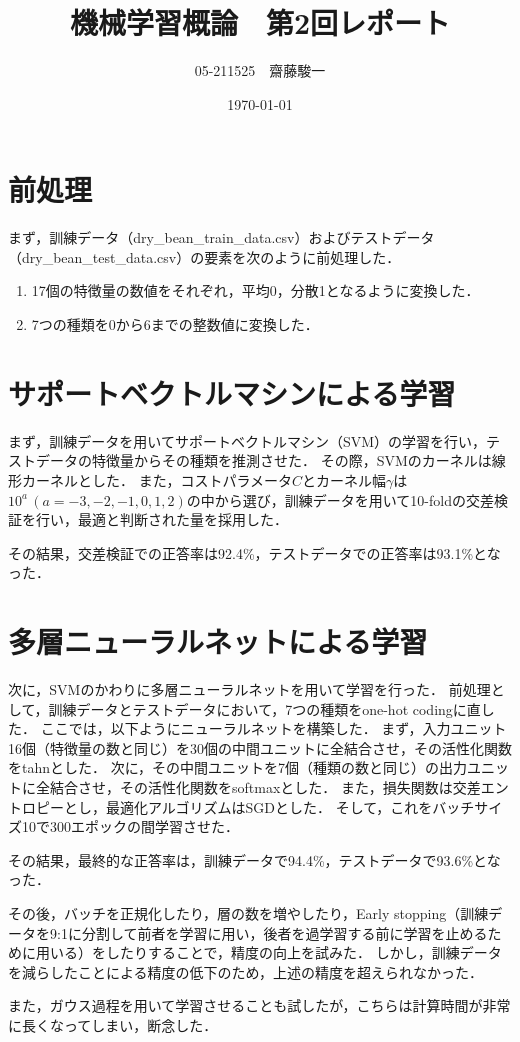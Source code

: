 \documentclass[a4paper,11pt]{jsarticle}
\begin{document}
\title{機械学習概論　第2回レポート}
\author{05-211525　齋藤駿一}
\date{\today}
\maketitle

\section{前処理}
まず，訓練データ（dry\_bean\_train\_data.csv）およびテストデータ（dry\_bean\_test\_data.csv）の要素を次のように前処理した．

\begin{enumerate}
  \item 17個の特徴量の数値をそれぞれ，平均0，分散1となるように変換した．
  \item 7つの種類を0から6までの整数値に変換した．
\end{enumerate}

\section{サポートベクトルマシンによる学習}

まず，訓練データを用いてサポートベクトルマシン（SVM）の学習を行い，テストデータの特徴量からその種類を推測させた．
その際，SVMのカーネルは線形カーネルとした．
また，コストパラメータ$C$とカーネル幅$\gamma$は$10^{a}\,(a=-3,-2,-1,0,1,2)$の中から選び，訓練データを用いて10-foldの交差検証を行い，最適と判断された量を採用した．

その結果，交差検証での正答率は92.4\%，テストデータでの正答率は93.1\%となった．

\section{多層ニューラルネットによる学習}

次に，SVMのかわりに多層ニューラルネットを用いて学習を行った．
前処理として，訓練データとテストデータにおいて，7つの種類をone-hot codingに直した．
ここでは，以下ようにニューラルネットを構築した．
まず，入力ユニット16個（特徴量の数と同じ）を30個の中間ユニットに全結合させ，その活性化関数をtahnとした．
次に，その中間ユニットを7個（種類の数と同じ）の出力ユニットに全結合させ，その活性化関数をsoftmaxとした．
また，損失関数は交差エントロピーとし，最適化アルゴリズムはSGDとした．
そして，これをバッチサイズ10で300エポックの間学習させた．

その結果，最終的な正答率は，訓練データで94.4\%，テストデータで93.6\%となった．

その後，バッチを正規化したり，層の数を増やしたり，Early stopping（訓練データを9:1に分割して前者を学習に用い，後者を過学習する前に学習を止めるために用いる）をしたりすることで，精度の向上を試みた．
しかし，訓練データを減らしたことによる精度の低下のため，上述の精度を超えられなかった．

また，ガウス過程を用いて学習させることも試したが，こちらは計算時間が非常に長くなってしまい，断念した．
\end{document}
